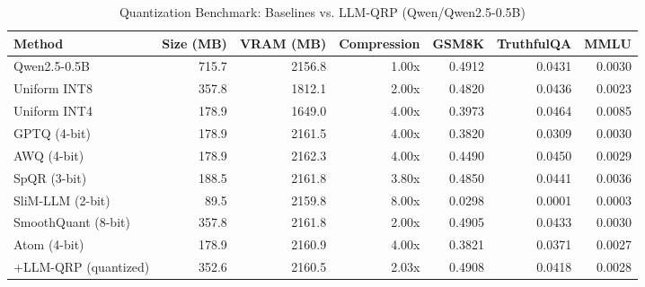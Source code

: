 \begin{table}[htbp]
  \centering
  \small
  \caption{Quantization Benchmark: Baselines vs. LLM-QRP (Qwen/Qwen2.5-0.5B)}
  \label{tab:benchmark}
  \begin{tabular}{lrrrrrr}
    \toprule
    \textbf{Method} & \textbf{Size (MB)} & \textbf{VRAM (MB)} & \textbf{Compression} & \textbf{GSM8K} & \textbf{TruthfulQA} & \textbf{MMLU} \\
    \midrule
    Qwen2.5-0.5B & 715.7 & 2156.8 & 1.00x & 0.4912 & 0.0431 & 0.0030 \\
    Uniform INT8 & 357.8 & 1812.1 & 2.00x & 0.4820 & 0.0436 & 0.0023 \\
    Uniform INT4 & 178.9 & 1649.0 & 4.00x & 0.3973 & 0.0464 & 0.0085 \\
    GPTQ (4-bit) & 178.9 & 2161.5 & 4.00x & 0.3820 & 0.0309 & 0.0030 \\
    AWQ (4-bit) & 178.9 & 2162.3 & 4.00x & 0.4490 & 0.0450 & 0.0029 \\
    SpQR (3-bit) & 188.5 & 2161.8 & 3.80x & 0.4850 & 0.0441 & 0.0036 \\
    SliM-LLM (2-bit) & 89.5 & 2159.8 & 8.00x & 0.0298 & 0.0001 & 0.0003 \\
    SmoothQuant (8-bit) & 357.8 & 2161.8 & 2.00x & 0.4905 & 0.0433 & 0.0030 \\
    Atom (4-bit) & 178.9 & 2160.9 & 4.00x & 0.3821 & 0.0371 & 0.0027 \\
    \midrule
    +LLM-QRP (quantized) & 352.6 & 2160.5 & 2.03x & 0.4908 & 0.0418 & 0.0028 \\
    \bottomrule
  \end{tabular}
\end{table}
